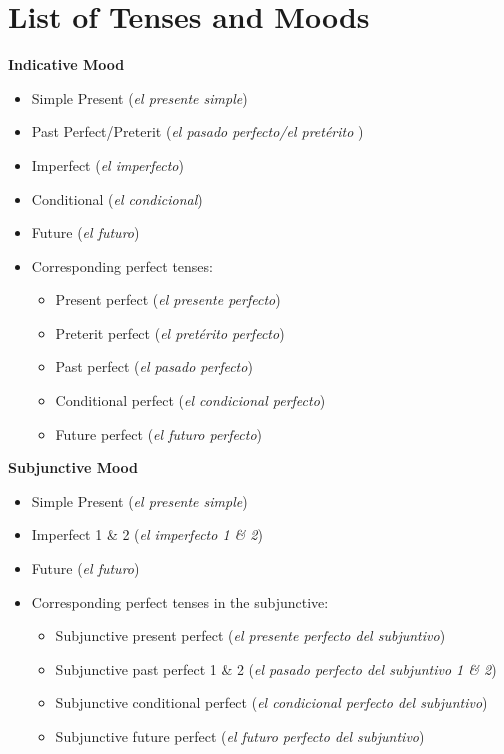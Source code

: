 \section{List of Tenses and Moods}
\label{subsec:tense}
\textbf{Indicative Mood}
	\begin{itemize}[noitemsep]
		\item Simple Present (\textit{el presente simple})
		\item Past Perfect/Preterit (\textit{el pasado perfecto/el pret\'{e}rito })
		\item Imperfect (\textit{el imperfecto})
		\item Conditional (\textit{el condicional})
		\item Future (\textit{el futuro})
		\item Corresponding perfect tenses:
			\begin{itemize}[noitemsep]
				\item Present perfect (\textit{el presente perfecto})
				\item Preterit perfect (\textit{el pret\'{e}rito perfecto})
				\item Past perfect (\textit{el pasado perfecto})
				\item Conditional perfect (\textit{el condicional perfecto})
				\item Future perfect (\textit{el futuro perfecto})
			\end{itemize}
	\end{itemize}

\textbf{Subjunctive Mood}
	\begin{itemize}[noitemsep]
		\item Simple Present (\textit{el presente simple})
		\item Imperfect 1 \& 2 (\textit{el imperfecto 1 \& 2}) 
		\item Future (\textit{el futuro})
		\item Corresponding perfect tenses in the subjunctive:
			\begin{itemize}[noitemsep]
				\item Subjunctive present perfect (\textit{el presente perfecto del subjuntivo}) 
				\item Subjunctive past perfect 1 \& 2 (\textit{el pasado perfecto del subjuntivo 1 \& 2})
				\item Subjunctive conditional perfect (\textit{el condicional perfecto del subjuntivo})
				\item Subjunctive future perfect (\textit{el futuro perfecto del subjuntivo})
			\end{itemize}
	\end{itemize}

